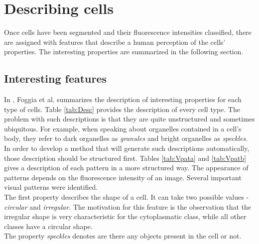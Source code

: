 
\chapter{Describing cells} %

\label{Chapter6} %


Once cells have been segmented and their fluorescence intensities classified, there are assigned with features that describe a human perception of the cells' properties. The interesting properties are summarized in the following section. 



\section{Interesting features}

In \cite{FoggiaBenchmarks2013}, Foggia et al. summarizes the description of interesting properties for each type of cells. Table \ref{tab:Desc} provides the description of every cell type. The problem with such descriptions is that they are quite unstructured and sometimes ubiquitous. For example, when speaking about organelles contained in a cell's body, they refer to dark organelles as \textit{granules} and bright organelles as \textit{speckles}. \\

In order to develop a method that will generate such descriptions automatically, those description should be structured first. Tables \ref{tab:Vpata} and \ref{tab:Vpatb} gives a description of each pattern in a more structured way. The appearance of patterns depends on the fluorescence intensity of an image. Several important visual patterns were identified. \\

The first property describes the shape of a cell. It can take two possible values - \textit{circular} and \textit{irregular}. The motivation for this feature is the observation that the irregular shape is very characteristic for the cytoplasmatic class, while all other classes have a circular shape. \\

The property \textit{speckles} denotes are there any objects present in the cell or not. \\

